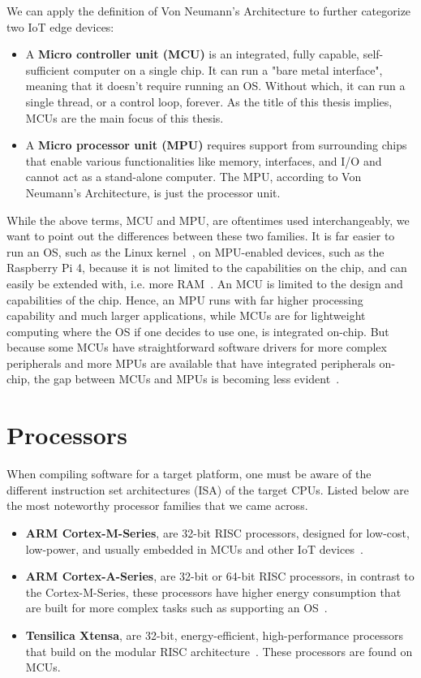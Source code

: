 We can apply the definition of Von Neumann's Architecture to further categorize two IoT edge devices:
\begin{itemize}
\item A \textbf{Micro controller unit (MCU)} is an integrated, fully capable, self-sufficient computer on a single chip. It can run a "bare metal interface", meaning that it doesn't require running an OS. Without which, it can run a single thread, or a control loop, forever. As the title of this thesis implies, MCUs are the main focus of this thesis. 
\item A \textbf{Micro processor unit (MPU)} requires support from surrounding chips that enable various functionalities like memory, interfaces, and I/O and cannot act as a stand-alone computer. The MPU, according to Von Neumann's Architecture, is just the processor unit.
\end{itemize}
While the above terms, MCU and MPU, are oftentimes used interchangeably, we want to point out the differences between these two families. It is far easier to run an OS, such as the Linux kernel~\cite{raspberrypios}, on MPU-enabled devices, such as the Raspberry Pi 4, because it is not limited to the capabilities on the chip, and can easily be extended with, i.e. more RAM~\cite{raspberrypi4}. An MCU is limited to the design and capabilities of the chip. Hence, an MPU runs with far higher processing capability and much larger applications, while MCUs are for lightweight computing where the OS if one decides to use one, is integrated on-chip. 
But because some MCUs have straightforward software drivers for more complex peripherals and more MPUs are available that have integrated peripherals on-chip, the gap between MCUs and MPUs is becoming less evident~\cite{peterson2021mcu, thornton2017mcu}.
%

\section {Processors}
When compiling software for a target platform, one must be aware of the different instruction set architectures (ISA) of the target CPUs. Listed below are the most noteworthy processor families that we came across.

\begin{itemize}
\item \textbf{ARM Cortex-M-Series}, are 32-bit RISC processors, designed for low-cost, low-power, and usually embedded in MCUs and other IoT devices~\cite{cortexm}.
\item \textbf{ARM Cortex-A-Series}, are 32-bit or 64-bit RISC processors, in contrast to the Cortex-M-Series, these processors have higher energy consumption that are built for more complex tasks such as supporting an OS~\cite{cortexa}.
\item \textbf{Tensilica Xtensa}, are 32-bit, energy-efficient, high-performance processors that build on the modular RISC architecture~\cite{xtensa}. These processors are found on MCUs.
\end{itemize}

